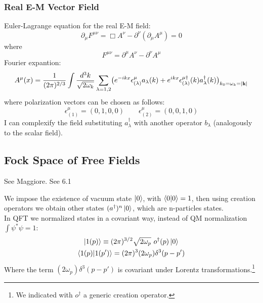 \documentclass[TheoreticalPhy_ModB.tex]{subfiles}
\begin{document}
\subsubsection{Real E-M Vector Field}
Euler-Lagrange equation for the real E-M field:
\[\partial_{\mu} F^{\mu \nu} = \Box A^{\nu} - \partial^{\nu}(\partial_{\mu} A^{\mu}) = 0\]
where 
\[F^{\mu \nu} = \partial^{\mu} A^{\nu} - \partial^{\nu} A^{\mu}\]
Fourier expantion:
\[
A^{\mu}(x) = \frac{1}{(2 \pi)^{2/3}} \int \frac{d^3 k}{\sqrt{2 \omega_k}} \sum_{\lambda=1,2} \bigl( e^{-ikx} \epsilon_{(\lambda)}^{\mu} a_{\lambda}(k) + e^{ikx} \epsilon_{(\lambda)}^{\mu \dagger}(k) a^{\dagger}_{\lambda}(k) \bigr)_{k_0 = \omega_k = \abs{\vec{k}}}\]
where polarization vectors can be chosen  as follows:
\[
\epsilon_{(1)}^{\mu} = (0, 1, 0, 0) \qquad \epsilon_{(2)}^{\mu} = (0, 0, 1, 0) 
\]
I can complexify the field substituting $a_{\lambda}^{\dagger}$ with another operator $b_{\lambda}$ (analogously to the scalar field).\\


\subsection{Fock Space of Free Fields}
\textsf{See Maggiore. See 6.1}

We impose the existence of vacuum state $\ket{0}$, with $\braket0=1$,  then using creation operators we obtain other states $(a^{\dagger})^n \ket{0}$, which are n-particles states.\\
In QFT we normalized states in a covariant way, instead of QM normalization $\int \psi^* \psi = 1$:%
\begin{subequations}
\begin{gather}
\ket{1(p)} \equiv (2 \pi)^{3/2} \sqrt{2 \omega_p}\ o^{\dagger}(p) \ket{0} \label{eqn:norm-states} \\
\braket{1(p)}{1(p')} = (2 \pi)^3 (2 \omega _p)\delta^3(p - p') \label{eqn:norm-trans} 
\end{gather}
\end{subequations}
Where the term $(2 \omega_ p)\delta^3(p - p')$ is covariant under Lorentz transformations.\footnote{We indicated with $o^\dagger$ a generic creation operator. }
\end{document}
